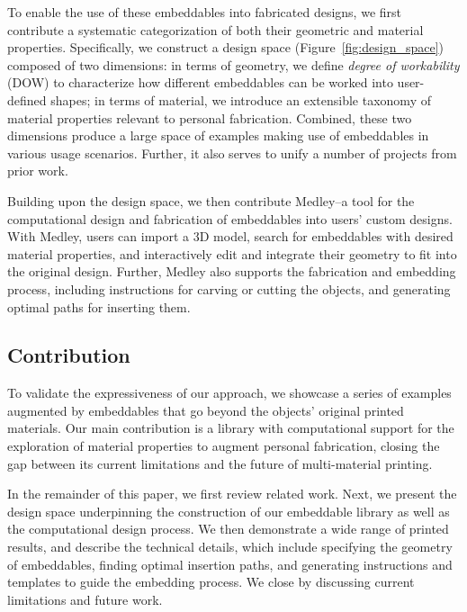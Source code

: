 To enable the use of these embeddables into fabricated designs, we first contribute a systematic categorization of both their geometric and material properties. Specifically, we construct a design space (Figure~\ref{fig:design_space}) composed of two dimensions: in terms of geometry, we define \textit{degree of workability} (DOW) to characterize how different embeddables can be worked into user-defined shapes; in terms of material, we introduce an extensible taxonomy of material properties relevant to personal fabrication. Combined, these two dimensions produce a large space of examples making use of embeddables in various usage scenarios. Further, it also serves to unify a number of projects from prior work.

Building upon the design space, we then contribute Medley--a tool for the computational design and fabrication of embeddables into users' custom designs. With Medley, users can import a 3D model, search for embeddables with desired material properties, and interactively edit and integrate their geometry to fit into the original design. Further, Medley also supports the fabrication and embedding process, including instructions for carving or cutting the objects, and generating optimal paths for inserting them.

\subsection{Contribution}
To validate the expressiveness of our approach, we showcase a series of examples augmented by embeddables that go beyond the objects' original printed materials. Our main contribution is a library with computational support for the exploration of material properties to augment personal fabrication, closing the gap between its current limitations and the future of multi-material printing.
	
In the remainder of this paper, we first review related work. Next, we present the design space underpinning the construction of our embeddable library as well as the computational design process. We then demonstrate a wide range of printed results, and describe the technical details, which include specifying the geometry of embeddables, finding optimal insertion paths, and generating instructions and templates to guide the embedding process. We close by discussing current limitations and future work.

